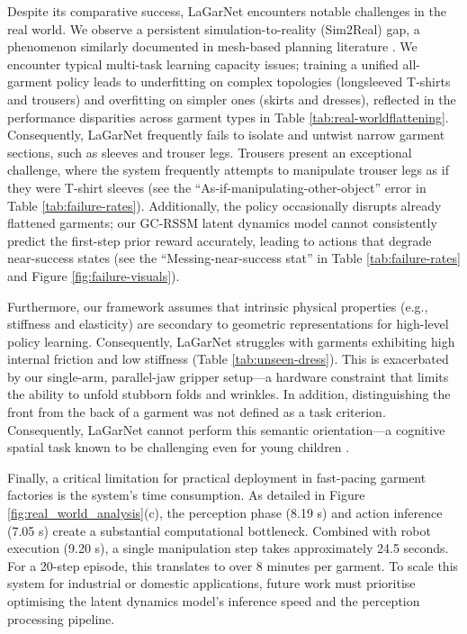 \documentclass[journal]{IEEEtran}
\newcommand{\addrealworld}[1]{\textcolor{brown!70!black}{#1}}
\begin{document}
\addrealworld{Despite its comparative success, LaGarNet encounters notable challenges in the real world. We observe a persistent simulation-to-reality (Sim2Real) gap, a phenomenon similarly documented in mesh-based planning literature \cite{huang2022mesh, lin2022learning}. We encounter typical multi-task learning capacity issues; training a unified all-garment policy leads to underfitting on complex topologies (longsleeved T-shirts and trousers) and overfitting on simpler ones (skirts and dresses), reflected in the performance disparities across garment types in Table \ref{tab:real-worldflattening}. Consequently, LaGarNet frequently fails to isolate and untwist narrow garment sections, such as sleeves and trouser legs. Trousers present an exceptional challenge, where the system frequently attempts to manipulate trouser legs as if they were T-shirt sleeves (see the ``As-if-manipulating-other-object'' error in Table \ref{tab:failure-rates}). Additionally, the policy occasionally disrupts already flattened garments; our GC-RSSM latent dynamics model cannot consistently predict the first-step prior reward accurately, leading to actions that degrade near-success states (see the  ``Messing-near-success stat'' in Table \ref{tab:failure-rates} and Figure \ref{fig:failure-visuals}).}

\addrealworld{Furthermore, our framework assumes that intrinsic physical properties (e.g., stiffness and elasticity) are secondary to geometric representations for high-level policy learning. Consequently, LaGarNet struggles with garments exhibiting high internal friction and low stiffness (Table \ref{tab:unseen-dress}). This is exacerbated by our single-arm, parallel-jaw gripper setup---a hardware constraint that limits the ability to unfold stubborn folds and wrinkles. In addition, distinguishing the front from the back of a garment was not defined as a task criterion. Consequently, LaGarNet cannot perform this semantic orientation---a cognitive spatial task known to be challenging even for young children \cite{paoletti2012pink}.}

\addrealworld{Finally, a critical limitation for practical deployment in fast-pacing garment factories is the system's time consumption. As detailed in Figure \ref{fig:real_world_analysis}(c), the perception phase (8.19 s) and action inference (7.05 s) create a substantial computational bottleneck. Combined with robot execution (9.20 s), a single manipulation step takes approximately 24.5 seconds. For a 20-step episode, this translates to over 8 minutes per garment. To scale this system for industrial or domestic applications, future work must prioritise optimising the latent dynamics model's inference speed and the perception processing pipeline.}
\end{document}
